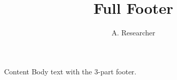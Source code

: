 \documentclass{beamer}
\title{Full Footer}
\author{A. Researcher}
\begin{document}
{
\begin{frame}[plain]\titlepage\end{frame}
}
\begin{frame}{Content}
Body text with the 3-part footer.
\end{frame}
\end{document}
